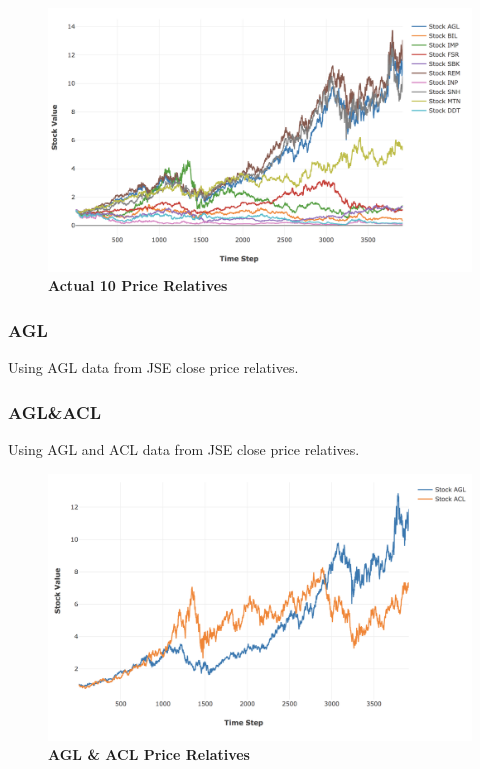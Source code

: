 \documentclass[a4paper,11pt,oneside]{article}
\theoremstyle{plain}
\theoremstyle{definition}
\begin{document}
	\begin{figure}[H]
		\centering
		\includegraphics[scale=0.45]{images/results/prices/actual10_prices.png} 
		\caption[Actual 10 Prices]{\textbf{Actual 10 Price Relatives}}
		\label{figure-actual10_prices}
	\end{figure}
	
	\subsubsection{AGL}\label{dataset_agl}
	
	Using AGL data from JSE close price relatives.
	
	\subsubsection{AGL\&ACL}\label{dataset_aglacl}
	
	Using AGL and ACL data from JSE close price relatives.
	
	\begin{figure}[H]
		\centering
		\includegraphics[scale=0.45]{images/results/prices/aglacl_prices.png} 
		\caption[AGL \& ACL Prices]{\textbf{AGL \& ACL Price Relatives}}
		\label{figure-aglacl_prices}
	\end{figure}
	
\end{document}
